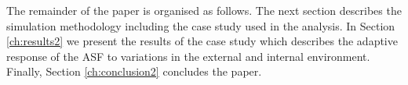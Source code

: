 %









The remainder of the paper is organised as follows. The next section describes the simulation methodology including the case study used in the analysis. In Section \ref{ch:results2} we present the results of the case study which describes the adaptive response of the ASF to variations in the external and internal environment. Finally, Section \ref{ch:conclusion2} concludes the paper.


